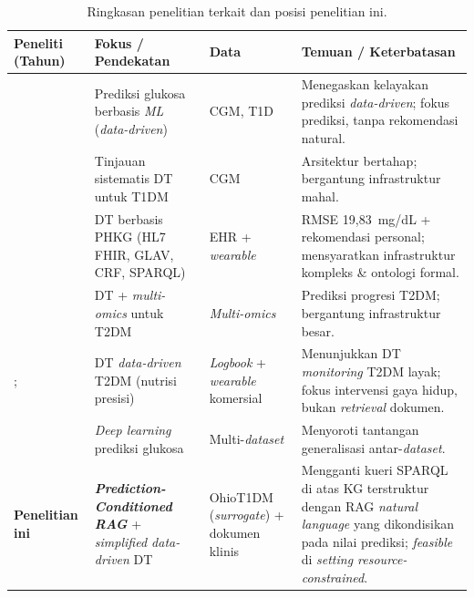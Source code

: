 \begin{table}[htbp]
\centering
\caption{Ringkasan penelitian terkait dan posisi penelitian ini.}
\label{tab:penelitian-terkait}
\small
\begin{tabular}{@{}p{2.8cm}p{2.9cm}p{2cm}p{4.6cm}@{}}
\toprule
\textbf{Peneliti (Tahun)} & \textbf{Fokus / Pendekatan} & \textbf{Data} & \textbf{Temuan / Keterbatasan} \\
\midrule
\textcite{woldaregay2019} & Prediksi glukosa berbasis \emph{ML} (\emph{data-driven}) & CGM, T1D & Menegaskan kelayakan prediksi \emph{data-driven}; fokus prediksi, tanpa rekomendasi natural. \\[2pt]
\textcite{cappon2024} & Tinjauan sistematis DT untuk T1DM & CGM & Arsitektur bertahap; bergantung infrastruktur mahal. \\[2pt]
\textcite{rad2024} & DT berbasis PHKG (HL7 FHIR, GLAV, CRF, SPARQL) & EHR + \emph{wearable} & RMSE 19,83~mg/dL + rekomendasi personal; mensyaratkan infrastruktur kompleks \& ontologi formal. \\[2pt]
\textcite{zhang2024} & DT + \emph{multi-omics} untuk T2DM & \emph{Multi-omics} & Prediksi progresi T2DM; bergantung infrastruktur besar. \\[2pt]
\textcite{shamanna2020}; \textcite{thamotharan2023} & DT \emph{data-driven} T2DM (nutrisi presisi) & \emph{Logbook} + \emph{wearable} komersial & Menunjukkan DT \emph{monitoring} T2DM layak; fokus intervensi gaya hidup, bukan \emph{retrieval} dokumen. \\[2pt]
\textcite{ghimire2024} & \emph{Deep learning} prediksi glukosa & Multi-\emph{dataset} & Menyoroti tantangan generalisasi antar-\emph{dataset}. \\[2pt]
\textbf{Penelitian ini} & \textbf{\emph{Prediction-Conditioned RAG}} + \emph{simplified data-driven} DT & OhioT1DM (\emph{surrogate}) + dokumen klinis & Mengganti kueri SPARQL di atas KG terstruktur dengan RAG \emph{natural language} yang dikondisikan pada nilai prediksi; \emph{feasible} di \emph{setting resource-constrained}. \\
\bottomrule
\end{tabular}
\end{table}
